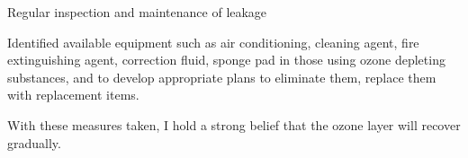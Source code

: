 \documentclass[12pt]{article}
\begin{document}
Regular inspection and maintenance of leakage

Identified available equipment such as air conditioning, cleaning agent, fire extinguishing agent, correction fluid, sponge pad in those using ozone depleting substances, and to develop appropriate plans to eliminate them, replace them with replacement items.

With these measures taken, I hold a strong belief that the ozone layer will recover gradually. \cite{OzoneHoleWatch}




\newpage
\end{document}
